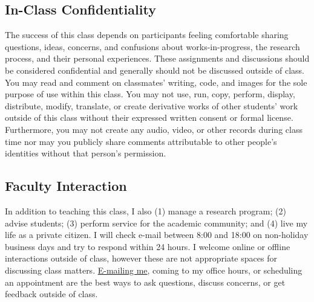 \documentclass[10pt]{memoir}
\begin{document}
\subsection{In-Class Confidentiality}
The success of this class depends on participants feeling comfortable sharing questions, ideas, concerns, and confusions about works-in-progress, the research process, and their personal experiences. These assignments and discussions should be considered confidential and generally should not be discussed outside of class. You may read and comment on classmates' writing, code, and images for the sole purpose of use within this class. You may not use, run, copy, perform, display, distribute, modify, translate, or create derivative works of other students' work outside of this class without their expressed written consent or formal license. Furthermore, you may not create any audio, video, or other records during class time nor may you publicly share comments attributable to other people's identities without that person's permission.

\subsection{Faculty Interaction}
In addition to teaching this class, I also (1) manage a research program; (2) advise students; (3) perform service for the academic community; and (4) live my life as a private citizen. I will check e-mail between 8:00 and 18:00 on non-holiday business days and try to respond within 24 hours. I welcome online or offline interactions outside of class, however these are not appropriate spaces for discussing class matters. \href{maito:brian.keegan@colorado.edu}{E-mailing me}, coming to my office hours, or scheduling an appointment are the best ways to ask questions, discuss concerns, or get feedback outside of class.

\end{document}

